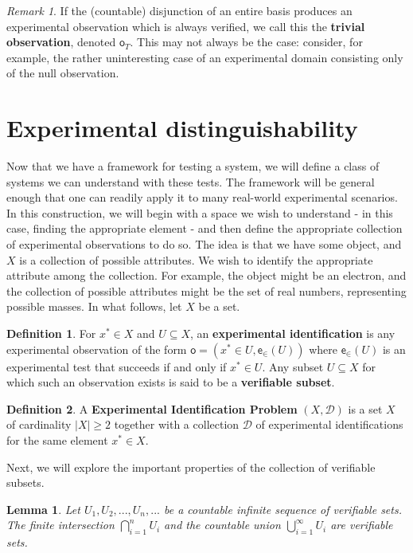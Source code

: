 \documentclass[review]{elsarticle}
\theoremstyle{plain}%
\newtheorem{lem}[thm]{Lemma}
\theoremstyle{definition}
\newtheorem{defn}{Definition}[section]
\theoremstyle{remark}
\newtheorem*{rem}{Remark}
\begin{document}
\begin{rem}
If the (countable) disjunction of an entire basis produces an experimental observation which is always verified, we call this the \textbf{trivial observation}, denoted $\mathsf{o}_T$. This may not always be the case: consider, for example, the rather uninteresting case of an experimental domain consisting only of the null observation. 
\end{rem}




\section{Experimental distinguishability}

Now that we have a framework for testing a system, we will define a class of systems we can understand with these tests. The framework will be general enough that one can readily apply it to many real-world experimental scenarios. In this construction, we will begin with a space we wish to understand - in this case, finding the appropriate element - and then define the appropriate collection of experimental observations to do so. The idea is that we have some object, and $X$ is a collection of possible attributes. We wish to identify the appropriate attribute among the collection. For example, the object might be an electron, and the collection of possible attributes might be the set of real numbers, representing possible masses. In what follows, let $X$ be a set. 

\begin{defn}
For $x^*\in X$ and $U\subseteq X$, an \textbf{experimental identification} is any experimental observation of the form $\mathsf{o} = (x^*\in U, \mathsf{e}_\in(U))$ where $\mathsf{e}_\in(U)$ is an experimental test that succeeds if and only if $x^*\in U$. Any subset $U\subseteq X$ for which such an observation exists is said to be a \textbf{verifiable subset}. 
\end{defn} 


\begin{defn}
A \textbf{Experimental Identification Problem} $(X,\mathcal{D})$ is a set $X$ of cardinality $|X|\geq2$ together with a collection $\mathcal{D}$ of experimental identifications for the same element $x^*\in X$. 
\end{defn}

Next, we will explore the important properties of the collection of verifiable subsets. 


\begin{lem}
\label{setbehavior}
	Let $U_1, U_2, ... , U_n, ...$ be a countable infinite sequence of verifiable sets. The finite intersection $\bigcap\limits_{i=1}^{n} U_i$ and the countable union $\bigcup\limits_{i=1}^{\infty} U_i$ are verifiable sets.
\end{lem}
\end{document}
